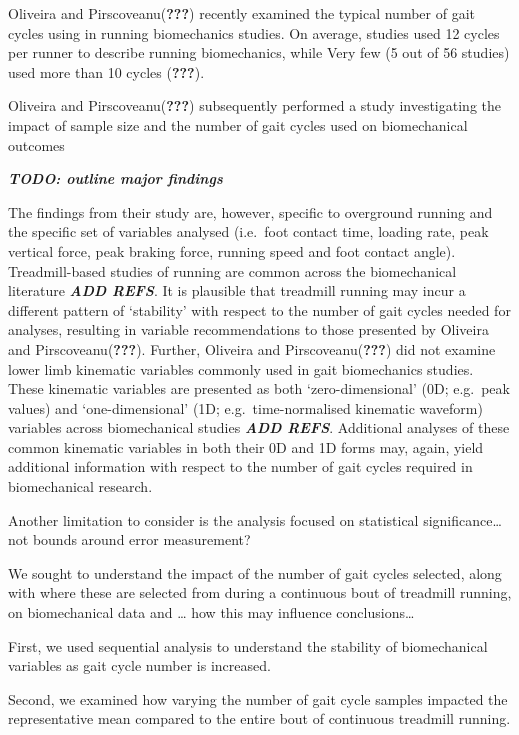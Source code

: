 \documentclass[]{elsarticle} %
\begin{document}
Oliveira and Pirscoveanu({\textbf{???}}) recently examined the typical
number of gait cycles using in running biomechanics studies. On average,
studies used 12 cycles per runner to describe running biomechanics,
while Very few (5 out of 56 studies) used more than 10 cycles
({\textbf{???}}).

Oliveira and Pirscoveanu({\textbf{???}}) subsequently performed a study
investigating the impact of sample size and the number of gait cycles
used on biomechanical outcomes

\textbf{\emph{TODO: outline major findings}}

The findings from their study are, however, specific to overground
running and the specific set of variables analysed (i.e.~foot contact
time, loading rate, peak vertical force, peak braking force, running
speed and foot contact angle). Treadmill-based studies of running are
common across the biomechanical literature \textbf{\emph{ADD REFS}}. It
is plausible that treadmill running may incur a different pattern of
`stability' with respect to the number of gait cycles needed for
analyses, resulting in variable recommendations to those presented by
Oliveira and Pirscoveanu({\textbf{???}}). Further, Oliveira and
Pirscoveanu({\textbf{???}}) did not examine lower limb kinematic
variables commonly used in gait biomechanics studies. These kinematic
variables are presented as both `zero-dimensional' (0D; e.g.~peak
values) and `one-dimensional' (1D; e.g.~time-normalised kinematic
waveform) variables across biomechanical studies \textbf{\emph{ADD
REFS}}. Additional analyses of these common kinematic variables in both
their 0D and 1D forms may, again, yield additional information with
respect to the number of gait cycles required in biomechanical research.

Another limitation to consider is the analysis focused on statistical
significance\ldots not bounds around error measurement?

We sought to understand the impact of the number of gait cycles
selected, along with where these are selected from during a continuous
bout of treadmill running, on biomechanical data and \ldots{} how this
may influence conclusions\ldots{}

First, we used sequential analysis to understand the stability of
biomechanical variables as gait cycle number is increased.

Second, we examined how varying the number of gait cycle samples
impacted the representative mean compared to the entire bout of
continuous treadmill running.
\end{document}
